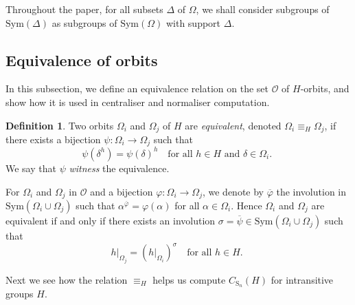 \documentclass[11pt,a4paper]{article}
\theoremstyle{definition}
\newtheorem{definition}[theorem]{Definition}
\theoremstyle{remark}
\newcommand{\Sym}[0]{\mathrm{Sym}}
\newcommand{\Sy}{\mathrm{S}}
\begin{document}
Throughout the paper, for all subsets $\Delta$ of $\Omega$, we shall consider subgroups of $\Sym(\Delta)$ as subgroups of $\Sym(\Omega)$ with support $\Delta$. 


\subsection{Equivalence of orbits}
\label{subsection: equiv orbs}

In this subsection, we define an equivalence relation on the set $\mathcal{O}$ of $H$-orbits, and show how it is used in centraliser and normaliser computation. 


\begin{definition} \label{defn: equiv orbs} \label{remark: bijection to permutation}
Two orbits $\Omega_i$ and $\Omega_j$ of $H$ are \emph{equivalent}, denoted $\Omega_i \equiv_H \Omega_j$, if  
there exists a bijection $\psi: \Omega_i \rightarrow \Omega_j$ such that 
\begin{equation} \label{eqn: def of equiv orbs}
\psi(\delta^h) = \psi(\delta)^h \quad \text{for all $h \in H$ and $\delta \in \Omega_i$. }
\end{equation}
We say that $\psi$ \emph{witness} the equivalence. 

For $\Omega_i$ and $\Omega_j$ in $\mathcal{O}$ and a bijection $\varphi : \Omega_i \rightarrow \Omega_j$, we denote by $\overline{\varphi}$ the involution in $\Sym(\Omega_i \cup \Omega_j)$ such that $\alpha^{\overline{\varphi}} = \varphi(\alpha)$ for all $\alpha \in \Omega_i$. 
Hence $\Omega_i$ and $\Omega_j$ are equivalent if and only if there exists an involution $\sigma = \overline{\psi} \in \Sym(\Omega_i  \cup \Omega_j)$ such that
\begin{equation} \label{equiv orb iff conjugates}
h|_{\Omega_j} = (h|_{\Omega_i})^{\sigma} \quad \text{for all $h \in H$. }
\end{equation}
\end{definition}

Next we see how the relation $\equiv_H$ helps us compute $C_{\Sy_n}(H)$ for intransitive groups $H$. 
\end{document}
